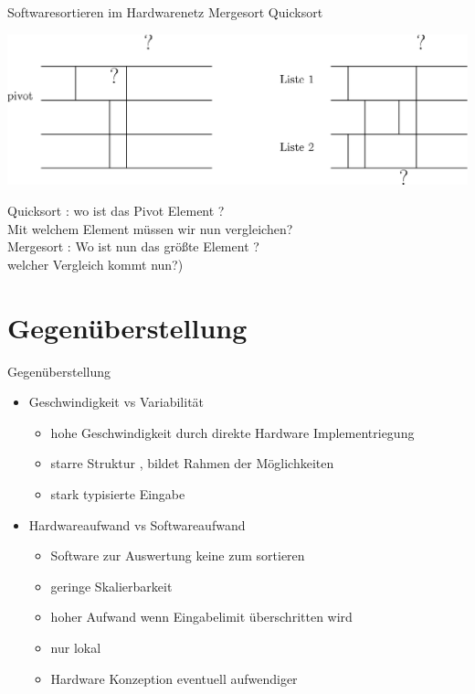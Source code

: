 \documentclass[ucs,9pt]{beamer}
\begin{document}
\begin{frame}{Softwaresortieren im Hardwarenetz}
Mergesort Quicksort
    \begin{center}
    		\includegraphics[scale=0.65]{mergesort.eps}
\end{center}     
 {Quicksort : wo ist das Pivot Element ?\\ Mit welchem Element müssen wir nun vergleichen?}\\
 {Mergesort : Wo ist nun das größte Element ? \\welcher Vergleich kommt nun?)}
\end{frame}

\section{Gegenüberstellung}
\begin{frame}{Gegenüberstellung}
    \begin{itemize}
        \item Geschwindigkeit vs Variabilität
        \begin{itemize}
            \item hohe Geschwindigkeit durch direkte Hardware Implementriegung
            \item starre Struktur , bildet Rahmen der Möglichkeiten
            \item stark typisierte Eingabe
        \end{itemize}
    \item Hardwareaufwand vs Softwareaufwand
        \begin{itemize}
            \item Software zur Auswertung keine zum sortieren
            \item geringe Skalierbarkeit
            \item hoher Aufwand wenn Eingabelimit überschritten wird
            \item nur lokal
            \item Hardware Konzeption eventuell aufwendiger
        \end{itemize}
    \end{itemize}
\end{frame}
\end{document}
